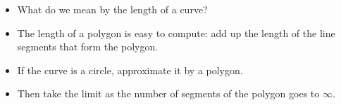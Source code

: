 \begin{frame}
\begin{center}
{}%
%
%
\end{center}
\begin{itemize}
\item  What do we mean by the length of a curve?
\item<2->  The length of a polygon is easy to compute: add up the length of the line segments that form the polygon.
\item<3->  If the curve is a circle, approximate it by a polygon.
\item<4->  Then take the limit as the number of segments of the polygon goes to $\infty$.
\end{itemize}
\end{frame}

